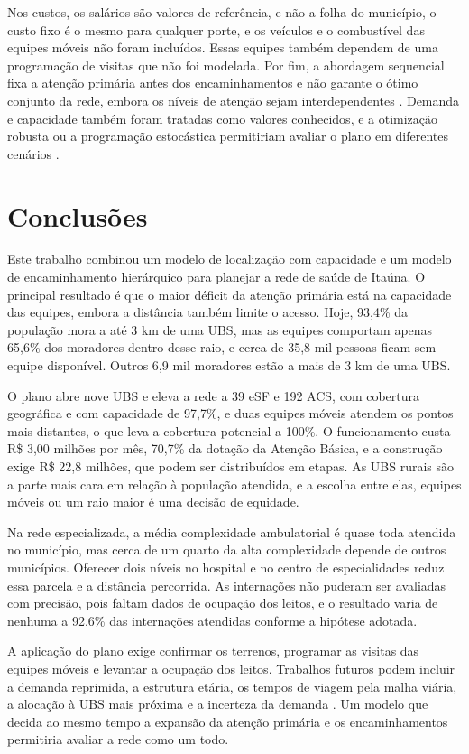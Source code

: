 \documentclass[12pt,a4paper,oneside]{report}
\begin{document}
Nos custos, os salários são valores de referência, e não a folha do município, o custo fixo é o mesmo
para qualquer porte, e os veículos e o combustível das equipes móveis não foram incluídos. Essas equipes
também dependem de uma programação de visitas que não foi modelada. Por fim, a abordagem sequencial fixa a
atenção primária antes dos encaminhamentos e não garante o ótimo conjunto da rede, embora os níveis de
atenção sejam interdependentes \citep{hodgson1988}. Demanda e capacidade também foram tratadas como
valores conhecidos, e a otimização robusta ou a programação estocástica permitiriam avaliar o plano em
diferentes cenários \citep{snyder2006}.

\chapter{Conclusões}
Este trabalho combinou um modelo de localização com capacidade e um modelo de encaminhamento hierárquico
para planejar a rede de saúde de Itaúna. O principal resultado é que o maior déficit da atenção primária está
na capacidade das equipes, embora a distância também limite o acesso. Hoje, 93,4\% da população mora a até 3 km de
uma UBS, mas as equipes comportam apenas 65,6\% dos moradores dentro desse raio, e cerca de 35,8 mil
pessoas ficam sem equipe disponível. Outros 6,9 mil moradores estão a mais de 3 km de uma UBS.

O plano abre nove UBS e eleva a rede a 39 eSF e 192 ACS, com cobertura geográfica e com capacidade de 97,7\%, e duas
equipes móveis atendem os pontos mais distantes, o que leva a cobertura potencial a 100\%. O funcionamento custa R\$ 3,00 milhões por mês, 70,7\% da
dotação da Atenção Básica, e a construção exige R\$ 22,8 milhões, que podem ser distribuídos em etapas. As
UBS rurais são a parte mais cara em relação à população atendida, e a escolha entre elas, equipes móveis
ou um raio maior é uma decisão de equidade.

Na rede especializada, a média complexidade ambulatorial é quase toda atendida no município, mas cerca de
um quarto da alta complexidade depende de outros municípios. Oferecer dois níveis no hospital e no centro
de especialidades reduz essa parcela e a distância percorrida. As internações não puderam ser avaliadas
com precisão, pois faltam dados de ocupação dos leitos, e o resultado varia de nenhuma a 92,6\% das
internações atendidas conforme a hipótese adotada.

A aplicação do plano exige confirmar os terrenos, programar as visitas das equipes móveis e levantar a
ocupação dos leitos. Trabalhos futuros podem incluir a demanda reprimida, a estrutura etária, os tempos de
viagem pela malha viária, a alocação à UBS mais próxima e a incerteza da demanda \citep{snyder2006}. Um
modelo que decida ao mesmo tempo a expansão da atenção primária e os encaminhamentos permitiria avaliar a
rede como um todo.
\end{document}
